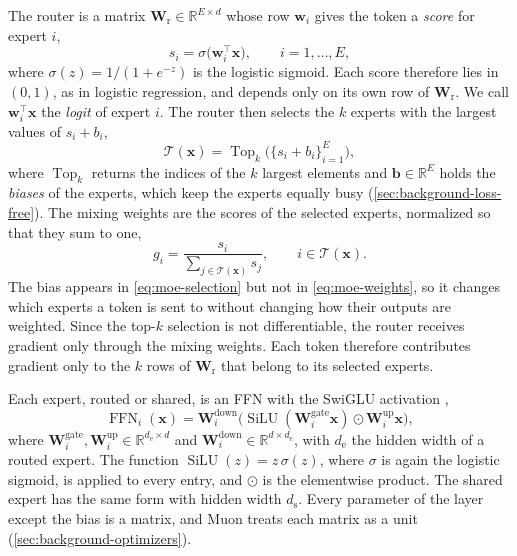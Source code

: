 The router is a matrix $\mathbf{W}_{\mathrm{r}} \in \mathbb{R}^{E \times d}$ whose row $\mathbf{w}_i$ gives the token a \emph{score} for expert $i$,
\begin{equation}[eq:moe-score]{}
  s_i = \sigma\bigl(\mathbf{w}_i^{\top} \mathbf{x}\bigr), \qquad i = 1, \dots, E,
\end{equation}
where $\sigma(z) = 1 / (1 + e^{-z})$ is the logistic sigmoid. Each score therefore lies in $(0, 1)$, as in logistic regression, and depends only on its own row of $\mathbf{W}_{\mathrm{r}}$. We call $\mathbf{w}_i^{\top} \mathbf{x}$ the \emph{logit} of expert $i$. The router then selects the $k$ experts with the largest values of $s_i + b_i$,
\begin{equation}[eq:moe-selection]{}
  \mathcal{T}(\mathbf{x}) = \operatorname{Top}_k \bigl( \{ s_i + b_i \}_{i=1}^{E} \bigr),
\end{equation}
where $\operatorname{Top}_k$ returns the indices of the $k$ largest elements and $\mathbf{b} \in \mathbb{R}^{E}$ holds the \emph{biases} of the experts, which keep the experts equally busy (\cref{sec:background-loss-free}). The mixing weights are the scores of the selected experts, normalized so that they sum to one,
\begin{equation}[eq:moe-weights]{}
  g_i = \frac{s_i}{\sum_{j \in \mathcal{T}(\mathbf{x})} s_j}, \qquad i \in \mathcal{T}(\mathbf{x}).
\end{equation}
The bias appears in \cref{eq:moe-selection} but not in \cref{eq:moe-weights}, so it changes which experts a token is sent to without changing how their outputs are weighted. Since the top-$k$ selection is not differentiable, the router receives gradient only through the mixing weights. Each token therefore contributes gradient only to the $k$ rows of $\mathbf{W}_{\mathrm{r}}$ that belong to its selected experts.

Each expert, routed or shared, is an FFN with the SwiGLU activation \cite{shazeer2020glu},
\begin{equation}[eq:moe-expert]{}
  \operatorname{FFN}_i(\mathbf{x}) = \mathbf{W}_i^{\mathrm{down}} \bigl( \operatorname{SiLU}(\mathbf{W}_i^{\mathrm{gate}} \mathbf{x}) \odot \mathbf{W}_i^{\mathrm{up}} \mathbf{x} \bigr),
\end{equation}
where $\mathbf{W}_i^{\mathrm{gate}}, \mathbf{W}_i^{\mathrm{up}} \in \mathbb{R}^{d_{\mathrm{e}} \times d}$ and $\mathbf{W}_i^{\mathrm{down}} \in \mathbb{R}^{d \times d_{\mathrm{e}}}$, with $d_{\mathrm{e}}$ the hidden width of a routed expert. The function $\operatorname{SiLU}(z) = z \, \sigma(z)$, where $\sigma$ is again the logistic sigmoid, is applied to every entry, and $\odot$ is the elementwise product. The shared expert has the same form with hidden width $d_{\mathrm{s}}$. Every parameter of the layer except the bias is a matrix, and Muon treats each matrix as a unit (\cref{sec:background-optimizers}).


